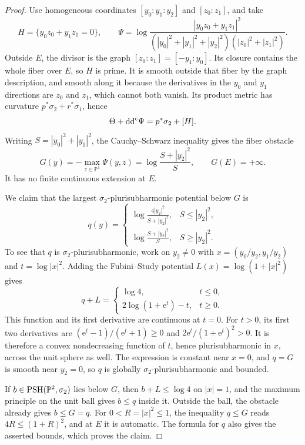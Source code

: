 \begin{proof}
Use homogeneous coordinates $[y_0:y_1:y_2]$ and $[z_0:z_1]$, and take
\[
 H=\{y_0z_0+y_1z_1=0\},\qquad
 \Psi=\log\frac{|y_0z_0+y_1z_1|^2}
 {(|y_0|^2+|y_1|^2+|y_2|^2)(|z_0|^2+|z_1|^2)}.
\]
Outside $E$, the divisor is the graph $[z_0:z_1]=[-y_1:y_0]$. Its closure contains the whole fiber over $E$, so $H$ is prime. It is smooth outside that fiber by the graph description, and smooth along it because the derivatives in the $y_0$ and $y_1$ directions are $z_0$ and $z_1$, which cannot both vanish. Its product metric has curvature $p^*\sigma_2+r^*\sigma_1$, hence
\[
 \Theta+\mathrm{dd}^{\mathrm{c}}\Psi=p^*\sigma_2+[H].
\]
Writing $S=|y_0|^2+|y_1|^2$, the Cauchy--Schwarz inequality gives the fiber obstacle
\[
 G(y)=-\max_{z\in\mathbb P^1}\Psi(y,z)
      =\log\frac{S+|y_2|^2}{S},\qquad G(E)=+\infty.
\]
It has no finite continuous extension at $E$.

We claim that the largest $\sigma_2$-plurisubharmonic potential below $G$ is
\[
 q(y)=\begin{cases}
 \displaystyle\log\frac{4|y_2|^2}{S+|y_2|^2},& S\leq|y_2|^2,\\[6pt]
 \displaystyle\log\frac{S+|y_2|^2}{S},& S\geq|y_2|^2.
 \end{cases}
\]
To see that $q$ is $\sigma_2$-plurisubharmonic, work on $y_2\ne0$ with $x=(y_0/y_2,y_1/y_2)$ and $t=\log|x|^2$. Adding the Fubini--Study potential $L(x)=\log(1+|x|^2)$ gives
\[
 q+L=\begin{cases}
 \log4,&t\leq0,\\
 2\log(1+\mathrm e^t)-t,&t\geq0.
 \end{cases}
\]
This function and its first derivative are continuous at $t=0$. For $t>0$, its first two derivatives are $(\mathrm e^t-1)/(\mathrm e^t+1)\geq0$ and $2\mathrm e^t/(1+\mathrm e^t)^2>0$. It is therefore a convex nondecreasing function of $t$, hence plurisubharmonic in $x$, across the unit sphere as well. The expression is constant near $x=0$, and $q=G$ is smooth near $y_2=0$, so $q$ is globally $\sigma_2$-plurisubharmonic and bounded.

If $b\in\mathrm{PSH}(\mathbb P^2,\sigma_2)$ lies below $G$, then $b+L\leq\log4$ on $|x|=1$, and the maximum principle on the unit ball gives $b\leq q$ inside it. Outside the ball, the obstacle already gives $b\leq G=q$. For $0<R=|x|^2\leq1$, the inequality $q\leq G$ reads $4R\leq(1+R)^2$, and at $E$ it is automatic. The formula for $q$ also gives the asserted bounds, which proves the claim.


\end{proof}
